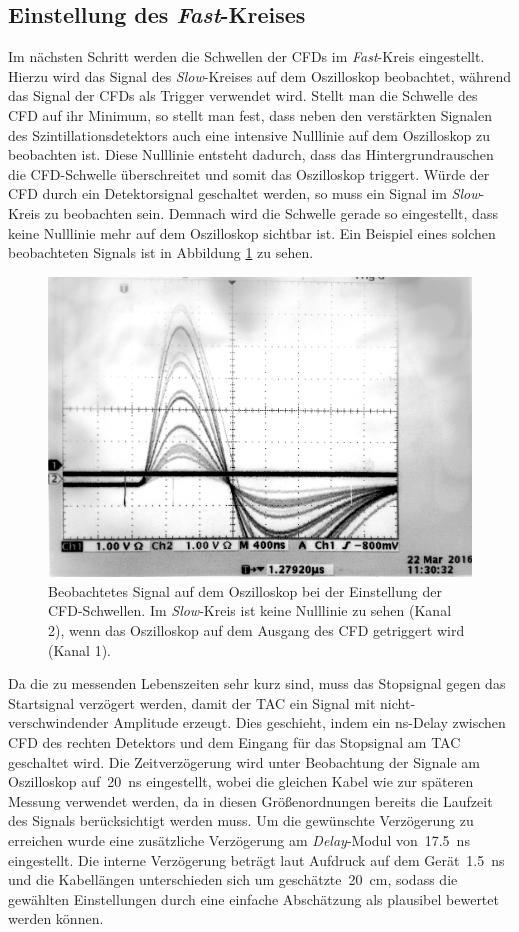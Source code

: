 \documentclass[11pt, a4paper]{article}
\numberwithin{equation}{section}
\begin{document}
\subsection{Einstellung des \textit{Fast}-Kreises}
\label{ssec:fastkreis}
Im nächsten Schritt werden die Schwellen der CFDs im \textit{Fast}-Kreis eingestellt.
Hierzu wird das Signal des \textit{Slow}-Kreises auf dem Oszilloskop beobachtet, während das Signal der CFDs als Trigger verwendet wird.
Stellt man die Schwelle des CFD auf ihr Minimum, so stellt man fest, dass neben den verstärkten Signalen des Szintillationsdetektors auch eine intensive Nulllinie auf dem Oszilloskop zu beobachten ist.
Diese Nulllinie entsteht dadurch, dass das Hintergrundrauschen die CFD-Schwelle überschreitet und somit das Oszilloskop triggert.
Würde der CFD durch ein Detektorsignal geschaltet werden, so muss ein Signal im \textit{Slow}-Kreis zu beobachten sein.
Demnach wird die Schwelle gerade so eingestellt, dass keine Nulllinie mehr auf dem Oszilloskop sichtbar ist.
Ein Beispiel eines solchen beobachteten Signals ist in Abbildung \ref{fig:cfd_threshold} zu sehen.
\begin{figure}[htbp]
	\centering
	\includegraphics[width=.8\textwidth]{./figures/cfd_threshold}
	\caption{Beobachtetes Signal auf dem Oszilloskop bei der Einstellung der CFD-Schwellen. Im \textit{Slow}-Kreis ist keine Nulllinie zu sehen (Kanal 2), wenn das Oszilloskop auf dem Ausgang des CFD getriggert wird (Kanal 1).}
	\label{fig:cfd_threshold}
\end{figure}

Da die zu messenden Lebenszeiten sehr kurz sind, muss das Stopsignal gegen das Startsignal verzögert werden, damit der TAC ein Signal mit nicht-verschwindender Amplitude erzeugt.
Dies geschieht, indem ein \si{ns}-Delay zwischen CFD des rechten Detektors und dem Eingang für das Stopsignal am TAC geschaltet wird.
Die Zeitverzögerung wird unter Beobachtung der Signale am Oszilloskop auf~\SI{20}{ns} eingestellt, wobei die gleichen Kabel wie zur späteren Messung verwendet werden, da in diesen Größenordnungen bereits die Laufzeit des Signals berücksichtigt werden muss.
Um die gewünschte Verzögerung zu erreichen wurde eine zusätzliche Verzögerung am \textit{Delay}-Modul von~\SI{17.5}{ns} eingestellt.
Die interne Verzögerung beträgt laut Aufdruck auf dem Gerät~\SI{1.5}{ns} und die Kabellängen unterschieden sich um geschätzte~\SI{20}{cm}, sodass die gewählten Einstellungen durch eine einfache Abschätzung als plausibel bewertet werden können.
\end{document}
